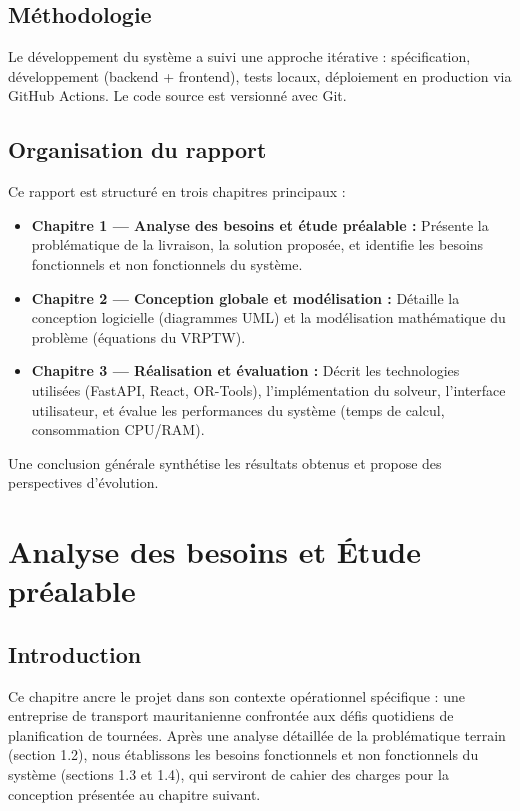\documentclass[12pt,a4paper]{report}
\begin{document}
\section*{Méthodologie}

Le développement du système a suivi une approche itérative : spécification, développement (backend + frontend), tests locaux, déploiement en production via GitHub Actions. Le code source est versionné avec Git.

\section*{Organisation du rapport}

Ce rapport est structuré en trois chapitres principaux :

\begin{itemize}[leftmargin=2.2em]
    \item \textbf{Chapitre 1 — Analyse des besoins et étude préalable :} Présente la problématique de la livraison, la solution proposée, et identifie les besoins fonctionnels et non fonctionnels du système.
    \item \textbf{Chapitre 2 — Conception globale et modélisation :} Détaille la conception logicielle (diagrammes UML) et la modélisation mathématique du problème (équations du VRPTW).
    \item \textbf{Chapitre 3 — Réalisation et évaluation :} Décrit les technologies utilisées (FastAPI, React, OR-Tools), l'implémentation du solveur, l'interface utilisateur, et évalue les performances du système (temps de calcul, consommation CPU/RAM).
\end{itemize}

Une conclusion générale synthétise les résultats obtenus et propose des perspectives d'évolution.
\chapter{Analyse des besoins et Étude préalable}

\section{Introduction}

Ce chapitre ancre le projet dans son contexte opérationnel spécifique : une entreprise de transport mauritanienne confrontée aux défis quotidiens de planification de tournées. Après une analyse détaillée de la problématique terrain (section 1.2), nous établissons les besoins fonctionnels et non fonctionnels du système (sections 1.3 et 1.4), qui serviront de cahier des charges pour la conception présentée au chapitre suivant.
\end{document}
